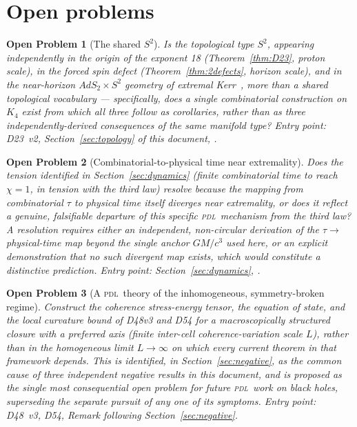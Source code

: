 \documentclass[12pt,a4paper]{article}
\newtheorem{openproblem}{Open Problem}
\newcommand{\Kfour}{K_4}
\newcommand{\PDL}{\textsc{pdl}}
\newcommand{\chif}{\chi}
\begin{document}
\section{Open problems}
\label{sec:open}

\begin{openproblem}[The shared $S^2$]
\label{OP-D65-1}
Is the topological type $S^2$, appearing independently in the
origin of the exponent 18 (Theorem~\ref{thm:D23}, proton scale), in
the forced spin defect (Theorem~\ref{thm:2defects}, horizon scale),
and in the near-horizon $AdS_2\times S^2$ geometry of extremal
Kerr~\citep{GuicaHartmanSongStrominger2009}, more than a shared
topological vocabulary --- specifically, does a single combinatorial
construction on $\Kfour$ exist from which all three follow as
corollaries, rather than as three independently-derived
consequences of the same manifold type? Entry point: D23~v2,
Section~\ref{sec:topology} of this document,
\citep{GuicaHartmanSongStrominger2009,HackoHawkingPerryStrominger2018}.
\end{openproblem}

\begin{openproblem}[Combinatorial-to-physical time near extremality]
\label{OP-D65-2}
Does the tension identified in Section~\ref{sec:dynamics}
(finite combinatorial time to reach $\chif=1$, in tension with the
third law) resolve because the mapping from combinatorial $\tau$
to physical time itself diverges near extremality, or does it
reflect a genuine, falsifiable departure of this specific \PDL\
mechanism from the third law? A resolution requires either an
independent, non-circular derivation of the $\tau\to$ physical-time
map beyond the single anchor $GM/c^3$ used here, or an explicit
demonstration that no such divergent map exists, which would
constitute a distinctive prediction. Entry point:
Section~\ref{sec:dynamics}, \citep{BardeenCarterHawking1973}.
\end{openproblem}

\begin{openproblem}[A \PDL\ theory of the inhomogeneous, symmetry-broken
regime]
\label{OP-D65-3}
Construct the coherence stress-energy tensor, the equation of
state, and the local curvature bound of D48v3 and D54 for a
macroscopically structured closure with a preferred axis (finite
inter-cell coherence-variation scale $L$), rather than in the
homogeneous limit $L\to\infty$ on which every current theorem in
that framework depends. This is identified, in
Section~\ref{sec:negative}, as the common cause of three
independent negative results in this document, and is proposed as
the single most consequential open problem for future \PDL\ work on
black holes, superseding the separate pursuit of any one of its
symptoms. Entry point: D48~v3, D54, Remark following
Section~\ref{sec:negative}.
\end{openproblem}
\end{document}
